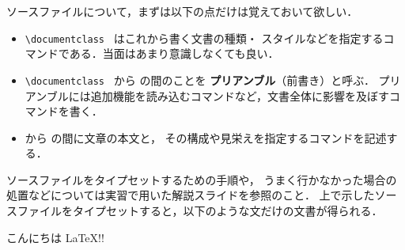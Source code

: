 ソースファイルについて，まずは以下の点だけは覚えておいて欲しい．

\begin{itemize}
\item \verb|\documentclass | はこれから書く文書の種類・
スタイルなどを指定するコマンドである．当面はあまり意識しなくても良い．
\item \verb|\documentclass | から \verb|| の間のことを
\textbf{プリアンブル}（前書き）と呼ぶ．
プリアンブルには追加機能を読み込むコマンドなど，文書全体に影響を及ぼすコマンドを書く．
\item \verb|| から \verb|| の間に文章の本文と，
その構成や見栄えを指定するコマンドを記述する．

\end{itemize}

ソースファイルをタイプセットするための手順や，
うまく行かなかった場合の処置などについては実習で用いた解説スライド\cite{JJ1-3}を参照のこと．
上で示したソースファイルをタイプセットすると，以下のような文だけの文書が得られる．

\begin{screen}
こんにちは \LaTeX !!
\end{screen}

